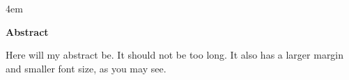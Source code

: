 \begingroup
\leftskip4em
\rightskip\leftskip
\begin{center}
  \large \bf Abstract 
\end{center}\vspace{-1.0\parskip}
\small
Here will my abstract be. It should not be too long. It also has a larger
margin and smaller font size, as you may see.
\par
\endgroup
